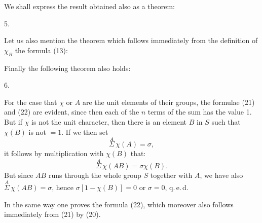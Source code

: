 
We shall express the result obtained also as a theorem:

5. 

Let us also mention the theorem which follows immediately from the definition of $\chi_B$  the formula (13):

Finally the following theorem also holds:

6. 

For the case that $\chi$ or $A$ are the unit elements of their groups, the formulae (21) and (22) are evident, since then each of the $n$ terms of the sum has the value 1. But if $\chi$ is not the unit character, then there is an element $B$ in $S$ such that $\chi(B)$ is not $= 1$. If we then set
\[
\overset{A}{\Sigma}\,\chi(A) = \sigma,
\]
it follows by multiplication with $\chi(B)$ that:
\[
\overset{A}{\Sigma}\,\chi(AB) = \sigma\chi(B).
\]
But since $AB$ runs through the whole group $S$ together with $A$, we have also $\overset{A}{\Sigma}\,\chi(AB) = \sigma$, hence $\sigma[1 - \chi(B)] = 0$ or $\sigma = 0$, q.\,e.\,d.

In the same way one proves the formula (22), which moreover also follows immediately from (21) by (20).
